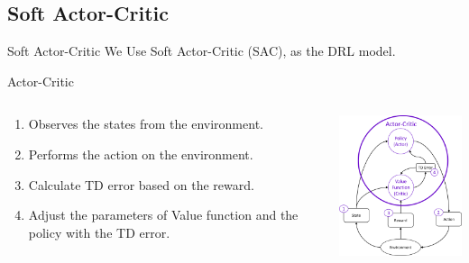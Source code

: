 \subsection{Soft Actor-Critic}


\begin{frame}{Soft Actor-Critic}
We Use Soft Actor-Critic (SAC), as the DRL model.
\begin{block}{Actor-Critic}
     \begin{columns}
        \begin{column}{0.45\textwidth}
        \begin{enumerate}
            \item Observes the states from the environment.
            \item Performs the action on the environment.
            \item Calculate TD error based on the reward.
            \item Adjust the parameters of Value function and the policy with the TD error.
        \end{enumerate}
        \end{column}
        \begin{column}{0.45\textwidth}
        \centering
        \includegraphics[width=5cm]{images/actor_critic.png}
     \end{column}
     \end{columns}
 \end{block}
\end{frame}

